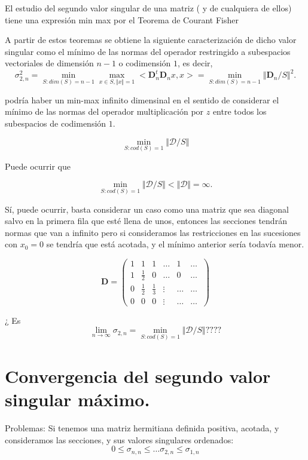 \documentclass[12pt,a4paper]{article}
\begin{document}
\noindent El estudio del segundo valor singular de una matriz ( y de cualquiera de ellos) tiene una expresi\'on min max por el Teorema de Courant Fisher

\noindent A partir de estos teoremas se obtiene la siguiente caracterizaci\'on de dicho valor singular como el mínimo  de las normas del operador restringido a subespacios vectoriales de dimensi\'on $n-1$ o codimensi\'on $1$, es decir, 
$$
\sigma_{2,n}^{2} = \min_{S: dim(S)=n-1} \max_{x\in S,\Vert x\Vert=1} <\mathbf{D}_n^t\mathbf{D}_n x,x>= \min_{S: dim(S)=n-1} \Vert \mathbf{D}_n/S\Vert^2.
$$







\noindent podría haber un min-max infinito dimensinal en el sentido de considerar el mínimo de las normas del operador multiplicaci\'on por $z$ entre todos los subespacios de codimensi\'on $1$. 

$$
\min_{S: cod(S)=1} \Vert \mathcal{D}/S \Vert 
$$

\noindent Puede ocurrir que 

$$
\min_{S: cod(S)=1} \Vert \mathcal{D}/S \Vert < \Vert \mathcal{D} \Vert = \infty.
$$

\noindent Sí, puede ocurrir, basta considerar un caso como una matriz que sea diagonal salvo en la primera fila que esté llena de unos, entonces las secciones tendrán normas que van a infinito pero si consideramos las restricciones en las sucesiones con $x_0=0$ se tendría que está acotada, y el mínimo anterior sería todavía menor. 


$$
\mathbf{D}= \begin{pmatrix}
  1  & 1 & 1& \hdots & 1 & \hdots  \\
  1       & \frac{1}{2} & 0  & \hdots & 0 & \hdots 
   \\
  0  & \frac{1}{2} & \frac{1}{3}  & \vdots  & \hdots & \hdots  
   \\
  0  & 0 & 0   & \vdots  & \hdots & \hdots  \
\end{pmatrix}
$$


 ¿ Es 
$$
\lim_{n\to \infty} \sigma_{2,n}= \min_{S: cod(S)=1} \Vert \mathcal{D}/S \Vert ????
$$
\section{Convergencia del  segundo valor singular m\'{a}ximo.}

\noindent Problemas:  Si tenemos una matriz hermitiana definida positiva, acotada, y consideramos las secciones, y sus valores singulares ordenados:
$$
0 \leq \sigma_{n,n}\leq \dots \sigma_{2,n} \leq \sigma_{1,n} 
$$
\end{document}
